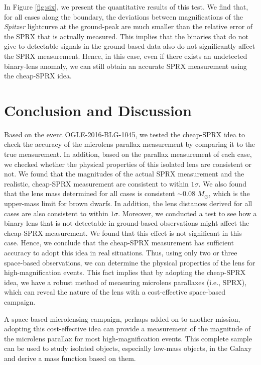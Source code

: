 \documentclass[10pt]{emulateapj}
\begin{document}
 In Figure \ref{fig:six}, we present the quantitative results of this test. We find that, for all 
cases along the boundary, the deviations between magnifications of the {\it Spitzer} lightcurve at 
the ground-peak are much smaller than the relative error of the SPRX that is actually measured. 
This implies that the binaries that do not give to detectable signals in the ground-based data 
also do not significantly affect the SPRX measurement. 
Hence, in this case, even if there exists an undetected binary-lens anomaly, we can still obtain 
an accurate SPRX measurement using the cheap-SPRX idea.

\section{Conclusion and Discussion}

 Based on the event OGLE-2016-BLG-1045, we tested the cheap-SPRX idea to check the accuracy of 
the microlens parallax measurement by comparing it to the true measurement. In addition, based on 
the parallax measurement of each case, we checked whether the physical properties of this 
isolated lens are consistent or not. We found that the magnitudes of the actual SPRX measurement and the 
realistic, cheap-SPRX measurement are consistent to within $1\sigma$. We also found 
that the lens mass determined for all cases is consistent $\sim 0.08$ $M_{\odot}$, which is the 
upper-mass limit for brown dwarfs. In addition, the lens distances derived for all cases are also 
consistent to within $1\sigma$.
Moreover, we conducted a test to see how a binary lens that is not detectable in ground-based 
observations might affect the cheap-SPRX measurement. We found that this effect is not significant 
in this case.
Hence, we conclude that the cheap-SPRX measurement has sufficient accuracy 
to adopt this idea in real situations. Thus, using only two or three space-based observations, we 
can determine the physical properties of the lens for high-magnification events. This fact implies 
that by adopting the cheap-SPRX idea, we have a robust method of measuring microlens parallaxes 
(i.e., SPRX), which can reveal the nature of the lens with a cost-effective space-based campaign.

 A space-based microlensing campaign, perhaps added on to another mission, adopting this cost-effective 
idea can provide a measurement of the magnitude of the microlens parallax for most high-magnification 
events. This complete sample can be used to study isolated objects, especially low-mass objects, 
in the Galaxy and derive a mass function based on them. 
\end{document}
